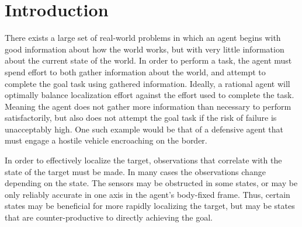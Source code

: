 \section{Introduction \label{sec:intro}}
	There exists a large set of real-world problems in which an agent begins with good information about how the world works, but with very little information about the current state of the world.  In order to perform a task, the agent must spend effort to both gather information about the world, and attempt to complete the goal task using gathered information.  Ideally, a rational agent will optimally balance localization effort against the effort used to complete the task.  Meaning the agent does not gather more information than necessary to perform satisfactorily, but also does not attempt the goal task if the risk of failure is unacceptably high.  One such example would be that of a defensive agent that must engage a hostile vehicle encroaching on the border.  
	
	In order to effectively localize the target, observations that correlate with the state of the target must be made.  In many cases the observations change depending on the state.  The sensors may be obstructed in some states, or may be only reliably accurate in one axis in the agent's body-fixed frame.  Thus, certain states may be beneficial for more rapidly localizing the target, but may be states that are counter-productive to directly achieving the goal.
	

